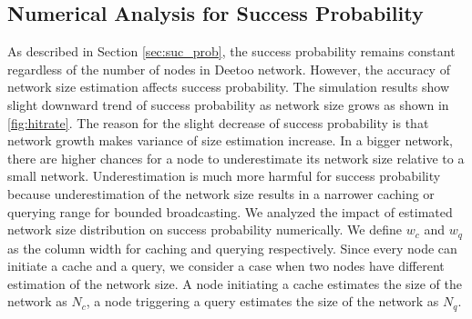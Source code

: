 \documentclass[9.5pt,journal,final,finalsubmission,twocolumn]{IEEEtran}
\begin{document}


\subsection{Numerical Analysis for Success Probability}
As described in Section \ref{sec:suc_prob}, the success probability remains constant 
regardless of the number of nodes in Deetoo network. However, 
the accuracy of network size estimation affects success probability.
The simulation results show slight downward trend of success probability as network size grows as shown in \ref{fig:hitrate}. 
The reason for the slight decrease of success probability is that network 
growth makes variance of size estimation increase. In a bigger network, there are higher 
chances for a node to underestimate its network size relative to a small network. 
Underestimation is much more harmful for success probability because underestimation 
of the network size results in a narrower caching or querying range for bounded broadcasting. 
We analyzed the impact of estimated network size distribution on success probability numerically.  
We define $w_c$ and $w_q$ as the column width for caching and
querying respectively.  Since every node can initiate a cache and a
query, we consider a case when two nodes have
different estimation of the network size. A node initiating a
cache estimates the size of the network as $N_c$, a node triggering
a query estimates the size of the network as $N_q$.
\end{document}
